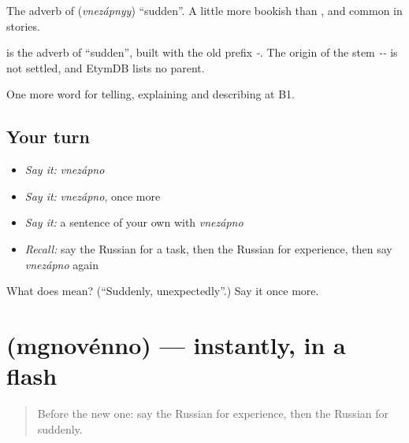 The adverb of \emph{} (\emph{vnezápnyy}) \textquotedblleft{}sudden\textquotedblright{}. A little more bookish than \emph{}, and common in stories.

\begin{cousinweb}
\emph{} is the adverb of \emph{} \textquotedblleft{}sudden\textquotedblright{}, built with the old prefix \emph{-}. The origin of the stem \emph{--} is not settled, and EtymDB lists no parent.
\end{cousinweb}

\begin{grammarlens}[title={What you've built}]
One more word for telling, explaining and describing at B1.
\end{grammarlens}

\subsection*{Your turn}
\begin{itemize}
\raggedright
  \item \emph{Say it:} \emph{vnezápno}
  \item \emph{Say it:} \emph{vnezápno}, once more
  \item \emph{Say it:} a sentence of your own with \emph{vnezápno}
  \item \emph{Recall:} say the Russian for a task, then the Russian for experience, then say \emph{vnezápno} again
\end{itemize}

\begin{tcolorbox}[breakable,colback=teal!4,colframe=teal!35!black,title={Before you move on}]
What does  mean? (\textquotedblleft{}Suddenly, unexpectedly\textquotedblright{}.) Say it once more.
\end{tcolorbox}
\section[\texorpdfstring{\ru{мгновенно} (mgnovénno)}{мгновенно (mgnovénno)}]{ (mgnovénno) — instantly, in a flash}

\label{lesson:RU-C271-mgnovenno}



\begin{quote}
Before the new one: say the Russian for experience, then the Russian for suddenly.
\end{quote}

